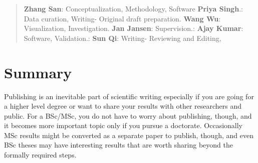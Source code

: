 \begin{quote}
\textbf{Zhang San}: Conceptualization, Methodology, Software \textbf{Priya Singh}.: Data curation, Writing- Original draft preparation. \textbf{Wang Wu}: Visualization, Investigation. \textbf{Jan Jansen}: Supervision.: \textbf{Ajay Kumar}: Software, Validation.: \textbf{Sun Qi}: Writing- Reviewing and Editing,
\end{quote}

\section{Summary}

Publishing is an inevitable part of scientific writing especially if you are going for a higher level degree or want to share your results with other researchers and public.
For a BSc/MSc, you do not have to worry about publishing, though, and it becomes more important topic only if you pursue a doctorate.
Occasionally MSc results might be converted as a separate paper to publish, though, and even BSc theses may have interesting results that are worth sharing beyond the formally required steps.
